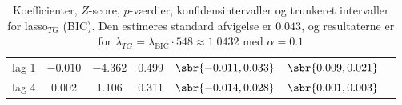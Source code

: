 \begin{table}[h]
{\begin{tabular}{lcccccc}
\textcolor{blue3}{lag 1}   & $- 0.010$& $ -4.362$  &0.499  &  $\sbr{-0.011 , 0.033}$&  $\sbr{0.009           ,    0.021 }$\\
\textcolor{blue3}{lag 4}  &0.002 &   1.106  &0.311    & $\sbr{ -0.014,   0.028 }$  & $\sbr{0.001              , 0.003}$\\
\bottomrule
\end{tabular}  
}
\caption{
Koefficienter, \(Z\)-score, \(p\)-værdier, konfidensintervaller og trunkeret intervaller for lasso\(_{TG}\) (BIC). Den estimeres standard afvigelse er \(0.043\), og resultaterne er for \(\lambda_{TG} = \lambda_\text{BIC} \cdot 548 \approx 1.0432\) med \(\alpha = 0.1\)} \label{tab:fixedLassoInf_bic}
\end{table} 
